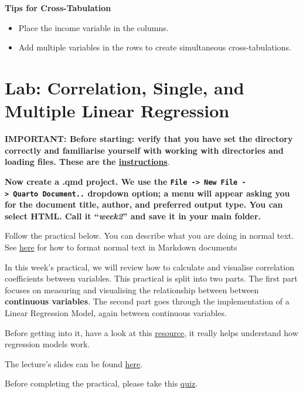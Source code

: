 \documentclass[
  letterpaper,
  DIV=11,
  numbers=noendperiod]{scrreprt}
\providecommand{\tightlist}{%
  \setlength{\itemsep}{0pt}\setlength{\parskip}{0pt}}\usepackage{longtable,booktabs,array}
\begin{document}
\textbf{Tips for Cross-Tabulation}

\begin{itemize}
\tightlist
\item
  Place the income variable in the columns.
\item
  Add multiple variables in the rows to create simultaneous
  cross-tabulations.
\end{itemize}


\chapter{Lab: Correlation, Single, and Multiple Linear
Regression}\label{lab-correlation-single-and-multiple-linear-regression}

\textbf{IMPORTANT: Before starting: verify that you have set the
directory correctly and familiarise yourself with working with
directories and loading files. These are the
\href{https://gdsl-ul.github.io/stats/general/wdPaths.html}{instructions}}.

\textbf{Now create a .qmd project. We use the
\texttt{File\ -\textgreater{}\ New\ File\ -\textgreater{}\ Quarto\ Document..}
dropdown option; a menu will appear asking you for the document title,
author, and preferred output type. You can select HTML. Call it
``\emph{week2}'' and save it in your main folder.}

Follow the practical below. You can describe what you are doing in
normal text. See
\href{https://quarto.org/docs/authoring/markdown-basics.html}{here} for
how to format normal text in Markdown documents

In this week's practical, we will review how to calculate and visualise
correlation coefficients between variables. This practical is split into
two parts. The first part focuses on measuring and visualising the
relationship between between \textbf{continuous variables}. The second
part goes through the implementation of a Linear Regression Model, again
between continuous variables.

Before getting into it, have a look at this
\href{https://mlu-explain.github.io/linear-regression/}{resource}, it
really helps understand how regression models work.

The lecture's slides can be found
\href{https://github.com/GDSL-UL/stats/blob/main/lectures/lecture08.pdf}{here}.

Before completing the practical, please take this
\href{https://canvas.liverpool.ac.uk/courses/84668/quizzes/169285?module_item_id=2435564}{quiz}.
\end{document}
